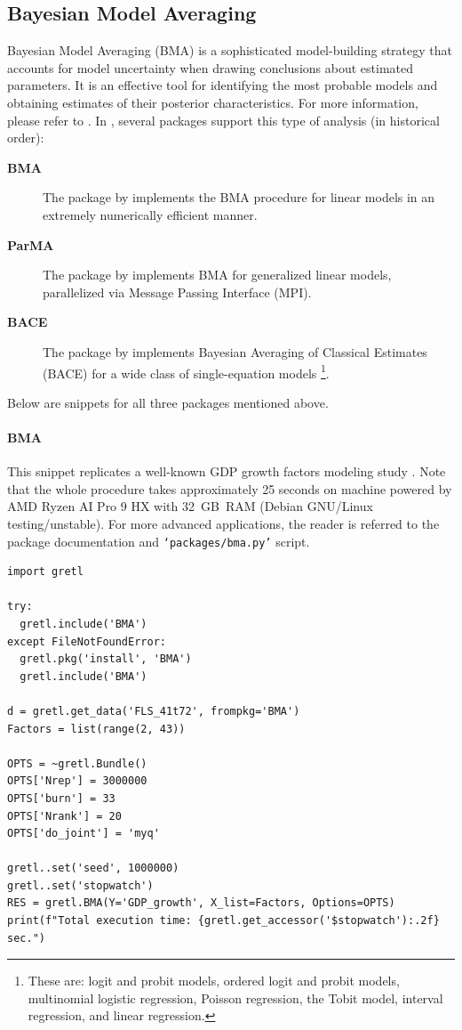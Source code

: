 \subsection{Bayesian Model Averaging}\label{sec.bma}
Bayesian Model Averaging (BMA) is a sophisticated
model-building strategy that accounts for model
uncertainty when drawing conclusions about estimated parameters.
It is an effective tool for identifying the most probable
models and obtaining estimates of their posterior
characteristics. For more information, please refer to
\cite{Steel2020}. In \gretl, several packages
support this type of analysis (in historical order):
\begin{description}
	\item[\textbf{BMA}] The package by \cite{BMA_JSS}
		implements the BMA procedure for linear models
		in an extremely numerically efficient manner.
	\item[\textbf{ParMA}] The package by \cite{ParMA_JSS}
		implements BMA for generalized linear models,
		parallelized via Message Passing Interface (MPI).
	\item[\textbf{BACE}] The package by \cite{BACE_JSS}
		implements Bayesian Averaging of Classical Estimates
		(BACE) for a wide class of single-equation models%
		\footnote{These are: logit and probit models, ordered
			logit and probit models, multinomial logistic
			regression, Poisson regression, the Tobit model,
			interval regression, and linear regression.}.
\end{description}
Below are snippets for all three packages mentioned above.

\paragraph{BMA}
This snippet replicates a well-known GDP growth factors modeling
study \cite[see][for details]{FernandezLeySteel2001_JoAE,
	FernandezLeySteel2001_JoE}.
Note that the whole procedure takes approximately 25 seconds
on machine powered by AMD Ryzen AI Pro 9 HX with 32~GB~RAM
(Debian GNU/Linux testing/unstable). For more advanced
applications, the reader is referred to the package
documentation and \texttt{`packages/bma.py'} script.
\begin{lstlisting}[style=pythonstylefoot]
import gretl

try:
  gretl.include('BMA')
except FileNotFoundError:
  gretl.pkg('install', 'BMA')
  gretl.include('BMA')

d = gretl.get_data('FLS_41t72', frompkg='BMA')
Factors = list(range(2, 43))

OPTS = ~gretl.Bundle()
OPTS['Nrep'] = 3000000
OPTS['burn'] = 33
OPTS['Nrank'] = 20
OPTS['do_joint'] = 'myq'

gretl..set('seed', 1000000)
gretl..set('stopwatch')
RES = gretl.BMA(Y='GDP_growth', X_list=Factors, Options=OPTS)
print(f"Total execution time: {gretl.get_accessor('$stopwatch'):.2f} sec.")
\end{lstlisting}%

